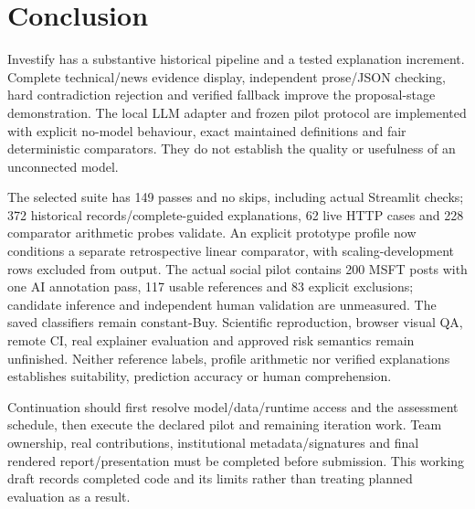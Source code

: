 \chapter{Conclusion}
Investify has a substantive historical pipeline and a tested explanation increment. Complete technical/news evidence display, independent prose/JSON checking, hard contradiction rejection and verified fallback improve the proposal-stage demonstration. The local LLM adapter and frozen pilot protocol are implemented with explicit no-model behaviour, exact maintained definitions and fair deterministic comparators. They do not establish the quality or usefulness of an unconnected model.

The selected suite has 149 passes and no skips, including actual Streamlit checks; 372 historical records/complete-guided explanations, 62 live HTTP cases and 228 comparator arithmetic probes validate. An explicit prototype profile now conditions a separate retrospective linear comparator, with scaling-development rows excluded from output. The actual social pilot contains 200 MSFT posts with one AI annotation pass, 117 usable references and 83 explicit exclusions; candidate inference and independent human validation are unmeasured. The saved classifiers remain constant-Buy. Scientific reproduction, browser visual QA, remote CI, real explainer evaluation and approved risk semantics remain unfinished. Neither reference labels, profile arithmetic nor verified explanations establishes suitability, prediction accuracy or human comprehension.

Continuation should first resolve model/data/runtime access and the assessment schedule, then execute the declared pilot and remaining iteration work. Team ownership, real contributions, institutional metadata/signatures and final rendered report/presentation must be completed before submission. This working draft records completed code and its limits rather than treating planned evaluation as a result.
